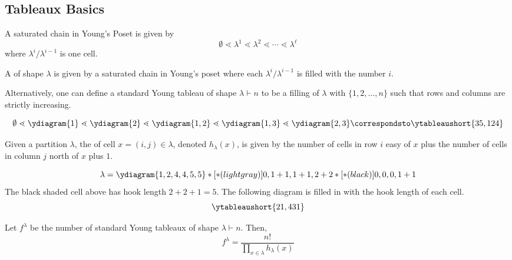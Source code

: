 \documentclass[11pt,leqno,oneside]{amsart}
\numberwithin{thm}{section}
\newcommand{\partitionof}{\vdash}
\newcommand{\coveredby}{\mathrel{\lessdot}}
\begin{document}
\subsection{Tableaux Basics}
\begin{prop}
  A saturated chain in Young's Poset is given by \[
    \emptyset \coveredby \lambda^1 \coveredby \lambda^2 \coveredby
    \cdots \coveredby \lambda^\ell
  \]
  where \(\lambda^i/\lambda^{i-1}\) is one cell.
\end{prop}
\begin{defn}
  A  of shape \(\lambda\) is given by a
  saturated chain in Young's poset where each
  \(\lambda^i/\lambda^{i-1}\) is filled with the number \(i\).

  Alternatively, one can define a standard Young tableau of shape
  \(\lambda \partitionof n\) to be a filling of \(\lambda\) with
  \(\{1,2,\ldots,n\}\) such that rows and columns are strictly
  increasing.
\end{defn}
\begin{example}
  \[
    \emptyset \coveredby \ydiagram{1} \coveredby \ydiagram{2}
    \coveredby \ydiagram{1,2} \coveredby \ydiagram{1,3} \coveredby
    \ydiagram{2,3} \correspondsto \ytableaushort{35,124}
  \]
\end{example}
\begin{defn}
  Given a partition \(\lambda\), the  of cell \(x =
  (i,j) \in \lambda\), denoted \(h_\lambda(x)\), is given by the
  number of cells in row \(i\) 
  easy of \(x\) plus the number of cells in column \(j\) north of
  \(x\) plus \(1\). 
\end{defn}
\begin{example}
  \[
    \lambda = \ydiagram{1,2,4,4,5,5}*[*(lightgray)]{0,1+1,1+1,2+2}*[*(black)]{0,0,0,1+1}
  \]
  The black shaded cell above has hook length \(2+2+1 = 5\). The
  following diagram is filled in with the hook length of each cell. \[
    \ytableaushort{21,431}
  \]
\end{example}
\begin{prop}
  Let \(f^\lambda\) be the number of standard Young tableaux of shape
  \(\lambda \partitionof n\). Then, \[
    f^\lambda = \frac{n!}{\prod_{x \in \lambda} h_\lambda(x)}
  \]
\end{prop}
\end{document}
